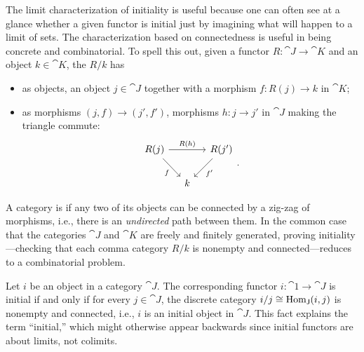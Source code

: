\documentclass[11pt]{article}
\numberwithin{equation}{section}
\begin{document}
The limit characterization of initiality is useful because one can often see at
a glance whether a given functor is initial just by imagining what will happen
to a limit of sets. The characterization based on connectedness is useful in
being concrete and combinatorial. To spell this out, given a functor
$R: \cat{J} \to \cat{K}$ and an object $k \in \cat{K}$, the 
$R/k$ has
\begin{itemize}
  \item as objects, an object $j \in \cat{J}$ together with a morphism
    $f: R(j) \to k$ in $\cat{K}$;
  \item as morphisms $(j, f) \to (j', f')$, morphisms $h: j \to j'$ in $\cat{J}$
    making the triangle commute:
    \begin{equation*}
      \begin{tikzcd}[column sep=small]
        {R(j)} && {R(j')} \\
        & k
        \arrow["{R(h)}", from=1-1, to=1-3]
        \arrow["f"', from=1-1, to=2-2]
        \arrow["{f'}", from=1-3, to=2-2]
      \end{tikzcd}.
    \end{equation*}
\end{itemize}
A category is  if any two of its objects can be connected by a
zig-zag of morphisms, i.e., there is an \emph{undirected} path between them. In
the common case that the categories $\cat{J}$ and $\cat{K}$ are freely and
finitely generated, proving initiality---checking that each comma category $R/k$
is nonempty and connected---reduces to a combinatorial problem.

\begin{example}
  Let $i$ be an object in a category $\cat{J}$. The corresponding functor
  $i: \cat{1} \to \cat{J}$ is initial if and only if for every $j \in \cat{J}$,
  the discrete category $i/j \cong \operatorname{Hom}_{\mathsf{J}}(i,j)$ is nonempty and
  connected, i.e., $i$ is an initial object in $\cat{J}$. This fact explains the
  term ``initial,'' which might otherwise appear backwards since initial
  functors are about limits, not colimits.
\end{example}
\end{document}
